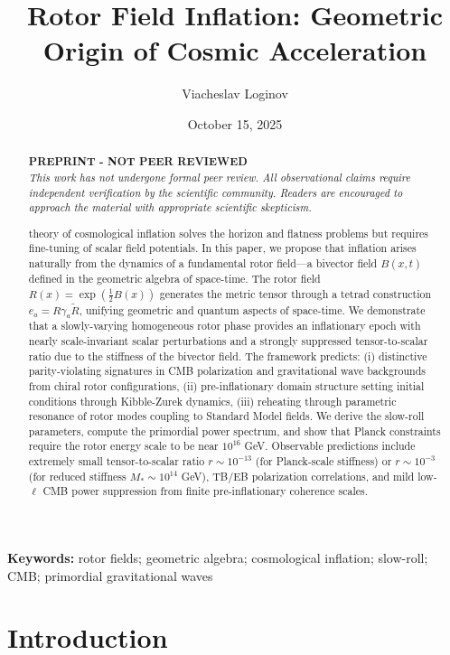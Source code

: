 \documentclass[11pt,a4paper]{article}
\title{Rotor Field Inflation: Geometric Origin of Cosmic Acceleration}
\author[1]{Viacheslav Loginov}
\affil[1]{Kyiv, Ukraine\\ \texttt{barthez.slavik@gmail.com}}
\date{October 15, 2025}
\numberwithin{equation}{section}
\theoremstyle{plain}
\theoremstyle{definition}
\theoremstyle{remark}
\newcommand{\keywords}{\textbf{Keywords:} rotor fields; geometric algebra; cosmological inflation; slow-roll; CMB; primordial gravitational waves}
\begin{document}
\maketitle

\begin{abstract}
\noindent
\textbf{PREPRINT - NOT PEER REVIEWED}\\
\textit{This work has not undergone formal peer review. All observational claims require independent verification by the scientific community. Readers are encouraged to approach the material with appropriate scientific skepticism.}

\medskip
\noindentThe theory of cosmological inflation solves the horizon and flatness problems but requires fine-tuning of scalar field potentials. In this paper, we propose that inflation arises naturally from the dynamics of a fundamental rotor field---a bivector field $B(x,t)$ defined in the geometric algebra of space-time. The rotor field $R(x) = \exp(\frac{1}{2}B(x))$ generates the metric tensor through a tetrad construction $e_a = R\gamma_a\widetilde{R}$, unifying geometric and quantum aspects of space-time. We demonstrate that a slowly-varying homogeneous rotor phase provides an inflationary epoch with nearly scale-invariant scalar perturbations and a strongly suppressed tensor-to-scalar ratio due to the stiffness of the bivector field. The framework predicts: (i) distinctive parity-violating signatures in CMB polarization and gravitational wave backgrounds from chiral rotor configurations, (ii) pre-inflationary domain structure setting initial conditions through Kibble-Zurek dynamics, (iii) reheating through parametric resonance of rotor modes coupling to Standard Model fields. We derive the slow-roll parameters, compute the primordial power spectrum, and show that Planck constraints require the rotor energy scale to be near $10^{16}$ GeV. Observable predictions include extremely small tensor-to-scalar ratio $r \sim 10^{-13}$ (for Planck-scale stiffness) or $r \sim 10^{-3}$ (for reduced stiffness $M_* \sim 10^{14}$ GeV), TB/EB polarization correlations, and mild low-$\ell$ CMB power suppression from finite pre-inflationary coherence scales.
\end{abstract}

\keywords

\section{Introduction}
\label{sec:intro}
\end{document}

